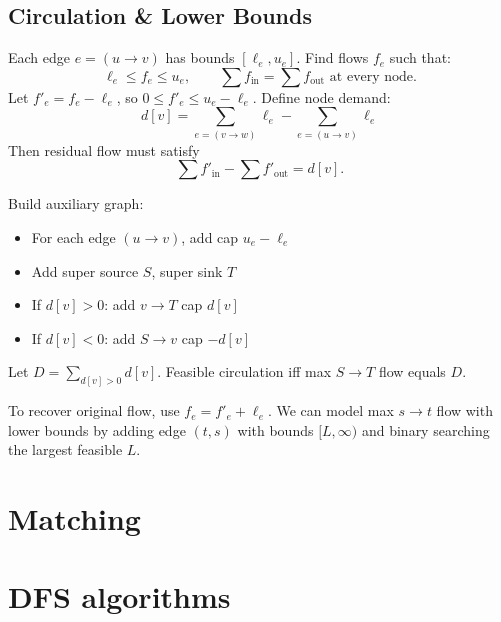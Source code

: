 	\subsection{Circulation \& Lower Bounds}

	Each edge $e=(u\to v)$ has bounds $[\ell_e, u_e]$.
	Find flows $f_e$ such that:
	\[
	\ell_e \le f_e \le u_e,\qquad
	\sum f_{\text{in}} = \sum f_{\text{out}} \text{ at every node.}
	\]
	Let $f'_e = f_e - \ell_e$, so $0 \le f'_e \le u_e - \ell_e$.
	Define node demand:
	\[
	d[v] = \sum_{e=(v\to w)} \ell_e - \sum_{e=(u\to v)} \ell_e
	\]
	Then residual flow must satisfy
	\[
	\sum f'_{\text{in}} - \sum f'_{\text{out}} = d[v].
	\]

	Build auxiliary graph:

	\begin{itemize}[noitemsep]
	\item For each edge $(u\to v)$, add cap $u_e-\ell_e$
	\item Add super source $S$, super sink $T$
	\item If $d[v]>0$: add $v\to T$ cap $d[v]$
	\item If $d[v]<0$: add $S\to v$ cap $-d[v]$
	\end{itemize}

	Let $D=\sum_{d[v]>0} d[v]$. Feasible circulation iff max $S \rightarrow T$ flow equals $D$.

	To recover original flow, use $f_e = f'_e + \ell_e$.
	We can model max $s \rightarrow t$ flow with lower bounds by adding edge $(t, s)$ with bounds $[L, \infty)$ and binary searching the largest feasible $L$. 


\section{Matching}

\section{DFS algorithms}

